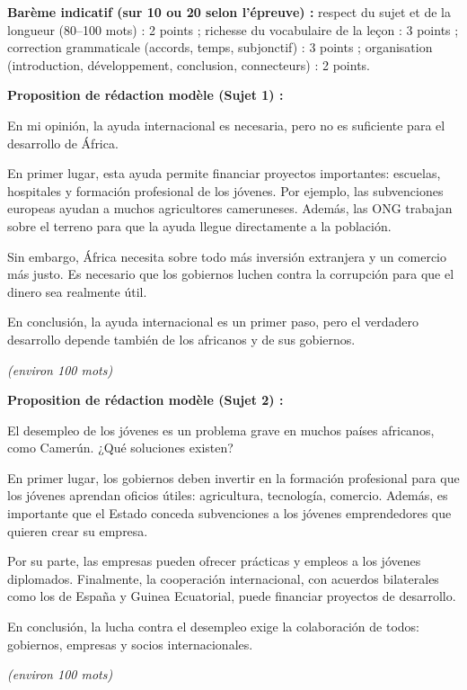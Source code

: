\documentclass[11pt]{article}
\begin{document}
\begin{corrige}
\textbf{Barème indicatif (sur 10 ou 20 selon l'épreuve) :} respect du sujet et de la longueur (80--100 mots) : 2 points ; richesse du vocabulaire de la leçon : 3 points ; correction grammaticale (accords, temps, subjonctif) : 3 points ; organisation (introduction, développement, conclusion, connecteurs) : 2 points.

\textbf{Proposition de rédaction modèle (Sujet 1) :}

\begin{textebox}
En mi opinión, la ayuda internacional es necesaria, pero no es suficiente para el desarrollo de África.

En primer lugar, esta ayuda permite financiar proyectos importantes: escuelas, hospitales y formación profesional de los jóvenes. Por ejemplo, las subvenciones europeas ayudan a muchos agricultores cameruneses. Además, las ONG trabajan sobre el terreno para que la ayuda llegue directamente a la población.

Sin embargo, África necesita sobre todo más inversión extranjera y un comercio más justo. Es necesario que los gobiernos luchen contra la corrupción para que el dinero sea realmente útil.

En conclusión, la ayuda internacional es un primer paso, pero el verdadero desarrollo depende también de los africanos y de sus gobiernos.
\end{textebox}
\emph{(environ 100 mots)}

\textbf{Proposition de rédaction modèle (Sujet 2) :}

\begin{textebox}
El desempleo de los jóvenes es un problema grave en muchos países africanos, como Camerún. ¿Qué soluciones existen?

En primer lugar, los gobiernos deben invertir en la formación profesional para que los jóvenes aprendan oficios útiles: agricultura, tecnología, comercio. Además, es importante que el Estado conceda subvenciones a los jóvenes emprendedores que quieren crear su empresa.

Por su parte, las empresas pueden ofrecer prácticas y empleos a los jóvenes diplomados. Finalmente, la cooperación internacional, con acuerdos bilaterales como los de España y Guinea Ecuatorial, puede financiar proyectos de desarrollo.

En conclusión, la lucha contra el desempleo exige la colaboración de todos: gobiernos, empresas y socios internacionales.
\end{textebox}
\emph{(environ 100 mots)}
\end{corrige}
\end{document}

